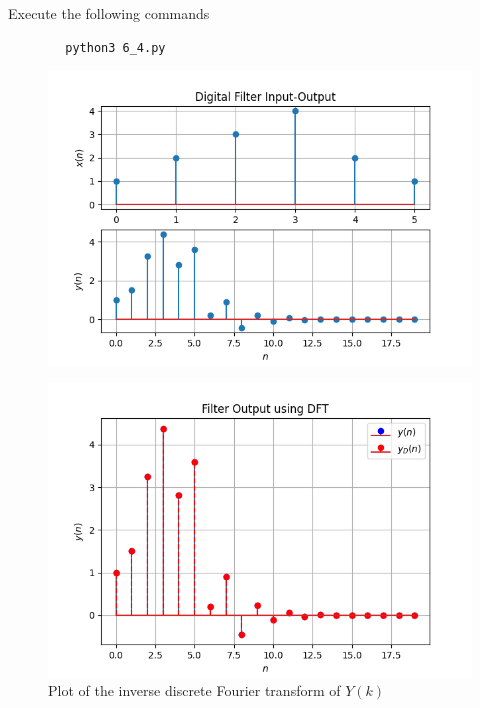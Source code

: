 \documentclass[journal,12pt,twocolumn]{IEEEtran}
\renewcommand\thesection{\arabic{section}}
\begin{document}
\begin{enumerate}[label=\thesection.\arabic*]
	Execute the following commands
	\begin{lstlisting}
		python3 6_4.py
	\end{lstlisting}
\begin{figure}[!ht]
	\centering
     \begin{center}
     	\includegraphics[width=\columnwidth]{./figs/3_2.png}
     \end{center}
    \end{figure}
   	\begin{figure}[!ht]
   	\centering
   	\includegraphics[width=\columnwidth]{./figs/6_3.png}
   	\caption{Plot of the inverse discrete Fourier transform of $Y(k)$}
   	\label{fig-6.3}	
   \end{figure}
	

\end{enumerate}
\end{document}
